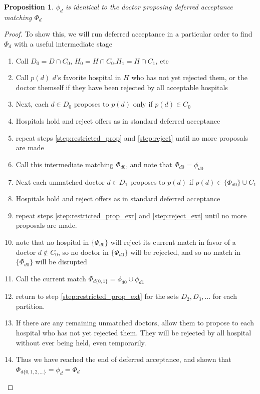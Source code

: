 \documentclass[WP]{AEA}
\newtheorem{prop}{Proposition}
\begin{document}
\begin{prop} \label{prop:equiv}
	$\phi_d $ is identical to the doctor proposing deferred acceptance matching $\Phi_d $
\end{prop}
\begin{proof}
	
 To show this, we will run deferred acceptance in a particular order to find $\Phi_d$ with a useful intermediate stage
 \begin{enumerate}
 	\item Call $D_0=D\cap C_0$, $H_0 = H \cap C_0$,$H_1 = H \cap C_1$, etc
 	\item Call $p(d)$ $d$'s favorite hospital in $H$ who has not yet rejected them, or the doctor themself if they have been rejected by all acceptable hospitals
 	\item \label{step:restricted_prop} Next, each $d \in D_0$ proposes to $p(d)$ only if $p(d) \in C_0$
 	\item \label{step:reject} Hospitals hold and reject offers as in standard deferred acceptance
 	\item repeat steps \ref{step:restricted_prop} and \ref{step:reject} until no more proposals are made
 	\item Call this intermediate matching $\Phi_{d0}$, and note that $\Phi_{d0} = \phi_{d0}$
 	\item \label{step:restricted_prop_ext} Next each unmatched doctor $d \in D_1$ proposes to $p(d)$ if $p(d) \in \{\Phi_{d0}\} \cup C_1$
 	\item \label{step:reject_ext} Hospitals hold and reject offers as in standard deferred acceptance 	
 	\item repeat steps \ref{step:restricted_prop_ext} and \ref{step:reject_ext} until no more proposals are made. 
 	\item note that no hospital in $\{\Phi_{d0}\}$ will reject its current match in favor of a doctor $d\notin C_0$, so no doctor in $\{\Phi_{d0}\}$ will be rejected, and so no match in $\{\Phi_{d0}\}$  will be disrupted
 	\item Call the current match  $\Phi_{d\{0,1\}}= \phi_{d0} \cup \phi_{d1}$
 	\item return to step \ref{step:restricted_prop_ext} for the sets $D_2, D_3, ...$ for each partition.
 	\item If there are any remaining unmatched doctors, allow them to propose to each hospital who has not yet rejected them. They will be rejected by all hospital without ever being held, even temporarily.  
 	\item Thus we have reached the end of deferred acceptance, and shown that $\Phi_{d\{0,1,2,...\}}= \phi_{d} =\Phi_{d}$
  \end{enumerate}
\end{proof}
\end{document}
